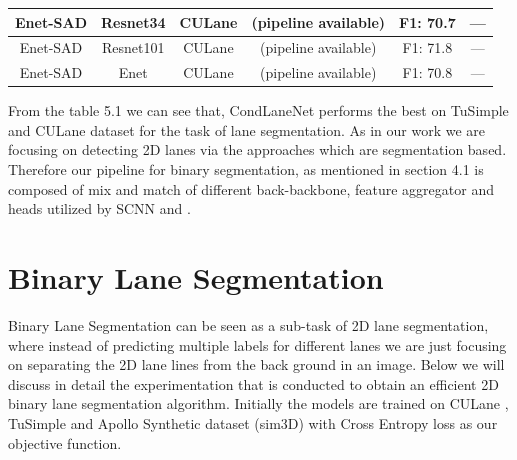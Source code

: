 \begin{table}[]
\begin{tabular}{|c|c|c|c|c|c|}
Enet-SAD          & Resnet34                                                            & CULane           & (pipeline available)                                                  & F1: 70.7                                                            & —                                                                                   \\ \hline
Enet-SAD          & Resnet101                                                           & CULane           & (pipeline available)                                                  & F1: 71.8                                                            & —                                                                                   \\ \hline
Enet-SAD          & Enet                                                                & CULane           & (pipeline available)                                                  & F1: 70.8                                                            & —                                                                                   \\ \hline
\end{tabular}
\end{table}
From the table 5.1 we can see that, CondLaneNet \cite{} performs the best on TuSimple and CULane dataset for the task of lane segmentation. As in our work we are focusing on detecting 2D lanes via the approaches which are segmentation based. Therefore our pipeline for binary segmentation, as mentioned in section 4.1 is composed of mix and match of different back-backbone, feature aggregator and heads utilized by SCNN \cite{} and \RESA{}. 
    
    
    \section{Binary Lane Segmentation}
    Binary Lane Segmentation can be seen as a sub-task of 2D lane segmentation, where instead of predicting multiple labels for different lanes we are just focusing on separating the 2D lane lines from the back ground in an image. Below we will discuss in detail the experimentation that is conducted to obtain an efficient 2D binary lane segmentation algorithm. Initially the models are trained on CULane \cite{}, TuSimple \cite{} and Apollo Synthetic dataset (sim3D) \cite{} with Cross Entropy loss as our objective function. 
    
